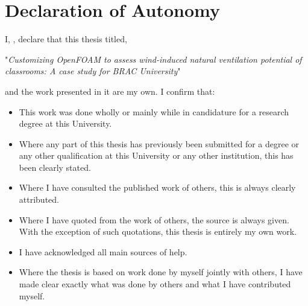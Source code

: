 \newpage
\thispagestyle{empty}
\chapter*{Declaration of Autonomy}





I, \autor, declare that this thesis titled, 

"\textit{Customizing OpenFOAM to assess wind-induced natural ventilation potential of classrooms: A case study for BRAC University}" 

and the work presented in it are my own. I confirm that:

\begin{itemize} 
\item This work was done wholly or mainly while in candidature for a research degree at this University.
\item Where any part of this thesis has previously been submitted for a degree or any other qualification at this University or any other institution, this has been clearly stated.
\item Where I have consulted the published work of others, this is always clearly attributed.
\item Where I have quoted from the work of others, the source is always given. With the exception of such quotations, this thesis is entirely my own work.
\item I have acknowledged all main sources of help.
\item Where the thesis is based on work done by myself jointly with others, I have made clear exactly what was done by others and what I have contributed myself.\\
\end{itemize}

